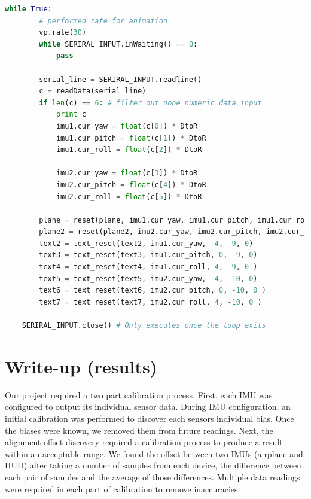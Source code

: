\begin{lstlisting}[language=python]
	while True:
		# performed rate for animation
		vp.rate(30)	
		while SERIRAL_INPUT.inWaiting() == 0:
			pass

		serial_line = SERIRAL_INPUT.readline()
		c = readData(serial_line)
		if len(c) == 6:	# filter out none numeric data input
			print c
			imu1.cur_yaw = float(c[0]) * DtoR
			imu1.cur_pitch = float(c[1]) * DtoR
			imu1.cur_roll = float(c[2]) * DtoR

			imu2.cur_yaw = float(c[3]) * DtoR
			imu2.cur_pitch = float(c[4]) * DtoR
			imu2.cur_roll = float(c[5]) * DtoR

		plane = reset(plane, imu1.cur_yaw, imu1.cur_pitch, imu1.cur_roll, vp.color.red)
		plane2 = reset(plane2, imu2.cur_yaw, imu2.cur_pitch, imu2.cur_roll, vp.color.green)
		text2 = text_reset(text2, imu1.cur_yaw, -4, -9, 0)
		text3 = text_reset(text3, imu1.cur_pitch, 0, -9, 0)
		text4 = text_reset(text4, imu1.cur_roll, 4, -9, 0 )
		text5 = text_reset(text5, imu2.cur_yaw, -4, -10, 0)
		text6 = text_reset(text6, imu2.cur_pitch, 0, -10, 0 )
		text7 = text_reset(text7, imu2.cur_roll, 4, -10, 0 )

	SERIRAL_INPUT.close() # Only executes once the loop exits
\end{lstlisting}

\newpage
\section{Write-up (results)}
Our project required a two part calibration process. First, each IMU was configured to output its individual sensor data. During IMU configuration, an initial calibration was performed to discover each sensors individual bias. Once the biases were known, we removed them from future readings. Next, the alignment offset discovery required a calibration process to produce a result within an acceptable range. We found the offset between two IMUs (airplane and HUD) after taking a number of samples from each device, the difference between each pair of samples and the average of those differences. Multiple data readings were required in each part of calibration to remove inaccuracies.\\

